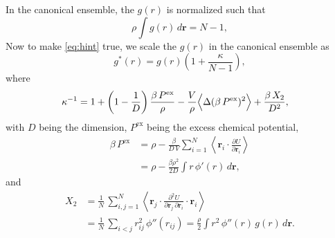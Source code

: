 \documentclass[preprint]{revtex4-1}
\newcommand{\vct}[1]{\mathbf{#1}}
\providecommand{\vr}{} %
\renewcommand{\vr}{\vct{r}}
\newcommand{\supex}[1]{ { { #1 }^{ \mathrm{ex} } } }
\newcommand{\Pex}{\supex{P}}
\begin{document}
In the canonical ensemble, the $g(r)$ is normalized such that
\[
  \rho \int g(r) \, d\vr = N - 1,
\]
Now to make \eqref{eq:hint} true, we scale the $g(r)$
in the canonical ensemble as
\[
  g^*(r) = g(r)
  \left(
  1 +
  \frac{ \kappa }{ N - 1}
  \right),
\]
where
\begin{align*}
\kappa^{-1}
&= 1
+ \left(1-\frac{1}{D}\right) \frac{ \beta \, \Pex }{ \rho}
- \frac{V}{\rho}
  \Bigl\langle
    \Delta (\beta \, \Pex)^2
  \Bigr\rangle
+ \frac{ \beta \, X_2 } { D^2 },
\end{align*}
with $D$ being the dimension, $\Pex$ being the excess chemical potential,
\begin{align*}
  \beta \, \Pex
&=
\rho
-
\frac{ \beta } { D \, V } \sum_{i = 1}^N
\left\langle
  \vr_i \cdot \frac{ \partial U } { \partial \vr_i }
\right\rangle
\\
&=
\rho
-
\frac{ \beta \rho^2 } { 2 D }
\int
r \, \phi'(r) \, d\vr,
\end{align*}
and
\begin{align*}
X_2
&= \frac{1}{N} \, \sum_{i, j = 1}^N
\left\langle
  \vr_j \cdot
  \frac{ \partial^2 U }
  { \partial \vr_j \, \partial \vr_i }
  \cdot \vr_i
\right\rangle
\\
&= \frac{1}{N} \, \sum_{i < j}
 r_{ij}^2 \, \phi''(r_{ij})
= \frac{ \rho }{ 2 }
   \int r^2 \, \phi''(r) \, g(r) \, d\vr.
\end{align*}


\end{document}
